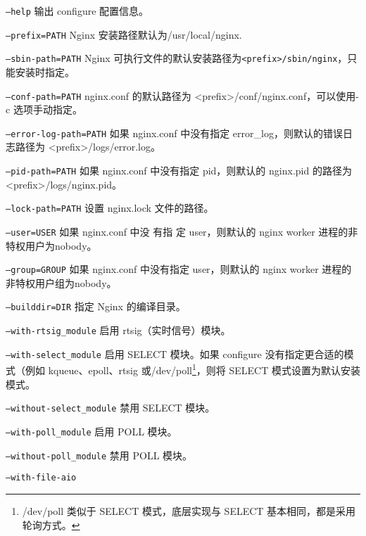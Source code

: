 \begin{compactitem}
\item \texttt{--help}
输出 configure 配置信息。
\item \texttt{--prefix=PATH}
Nginx 安装路径默认为/usr/local/nginx.
\item \texttt{--sbin-path=PATH}
Nginx 可执行文件的默认安装路径为\texttt{<prefix>/sbin/nginx}，只能安装时指定。
\item \texttt{--conf-path=PATH}
nginx.conf 的默认路径为 <prefix>/conf/nginx.conf，可以使用-c 选项手动指定。
\item \texttt{--error-log-path=PATH}
如果 nginx.conf 中没有指定 error\_log，则默认的错误日志路径为 <prefix>/logs/error.log。
\item \texttt{--pid-path=PATH}
如果 nginx.conf 中没有指定 pid，则默认的 nginx.pid 的路径为 <prefix>/logs/nginx.pid。
\item \texttt{--lock-path=PATH}
设置 nginx.lock 文件的路径。
\item \texttt{--user=USER}
如果 nginx.conf 中没 有指 定 user，则默认的 nginx worker 进程的非特权用户为nobody。
\item \texttt{--group=GROUP}
如果 nginx.conf 中没有指定 user，则默认的 nginx worker 进程的非特权用户组为nobody。
\item \texttt{--builddir=DIR}
指定 Nginx 的编译目录。
\item \texttt{--with-rtsig\_module}
启用 rtsig（实时信号）模块。
\item \texttt{--with-select\_module}
启用 SELECT 模块。如果 configure 没有指定更合适的模式（例如 kqueue、epoll、rtsig 或/dev/poll\footnote{/dev/poll 类似于 SELECT 模式，底层实现与 SELECT 基本相同，都是采用轮询方式。}，则将 SELECT 模式设置为默认安装模式。
\item \texttt{--without-select\_module}
禁用 SELECT 模块。
\item \texttt{--with-poll\_module}
启用 POLL 模块。
\item \texttt{--without-poll\_module}
禁用 POLL 模块。
\item \texttt{--with-file-aio}


\end{compactitem}
